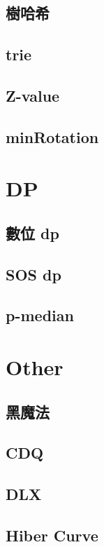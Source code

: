 \documentclass[a4paper,10pt,twocolumn,oneside]{article}
\begin{document}
\subsection{樹哈希}

\subsection{trie}

\subsection{Z-value}

\subsection{minRotation}

\section{DP}
\subsection{數位 dp}

\subsection{SOS dp}

\subsection{p-median}

\section{Other}
\subsection{黑魔法}

\subsection{CDQ}

\subsection{DLX}

\subsection{Hiber Curve}

\end{document}
